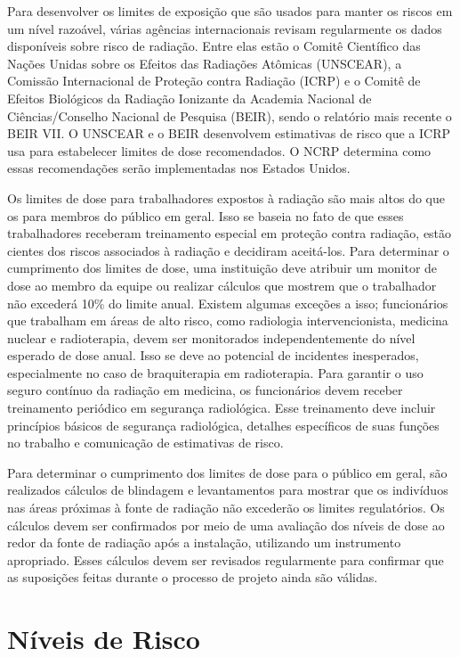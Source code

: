 \documentclass[11pt,a4paper]{article}
\begin{document}
	Para desenvolver os limites de exposição que são usados para manter os riscos em um nível razoável, várias agências internacionais revisam regularmente os dados disponíveis sobre risco de radiação. Entre elas estão o Comitê Científico das Nações Unidas sobre os Efeitos das Radiações Atômicas (UNSCEAR), a Comissão Internacional de Proteção contra Radiação (ICRP) e o Comitê de Efeitos Biológicos da Radiação Ionizante da Academia Nacional de Ciências/Conselho Nacional de Pesquisa (BEIR), sendo o relatório mais recente o BEIR VII. O UNSCEAR e o BEIR desenvolvem estimativas de risco que a ICRP usa para estabelecer limites de dose recomendados. O NCRP determina como essas recomendações serão implementadas nos Estados Unidos.

	Os limites de dose para trabalhadores expostos à radiação são mais altos do que os para membros do público em geral. Isso se baseia no fato de que esses trabalhadores receberam treinamento especial em proteção contra radiação, estão cientes dos riscos associados à radiação e decidiram aceitá-los. Para determinar o cumprimento dos limites de dose, uma instituição deve atribuir um monitor de dose ao membro da equipe ou realizar cálculos que mostrem que o trabalhador não excederá 10\% do limite anual. Existem algumas exceções a isso; funcionários que trabalham em áreas de alto risco, como radiologia intervencionista, medicina nuclear e radioterapia, devem ser monitorados independentemente do nível esperado de dose anual. Isso se deve ao potencial de incidentes inesperados, especialmente no caso de braquiterapia em radioterapia. Para garantir o uso seguro contínuo da radiação em medicina, os funcionários devem receber treinamento periódico em segurança radiológica. Esse treinamento deve incluir princípios básicos de segurança radiológica, detalhes específicos de suas funções no trabalho e comunicação de estimativas de risco.

	Para determinar o cumprimento dos limites de dose para o público em geral, são realizados cálculos de blindagem e levantamentos para mostrar que os indivíduos nas áreas próximas à fonte de radiação não excederão os limites regulatórios. Os cálculos devem ser confirmados por meio de uma avaliação dos níveis de dose ao redor da fonte de radiação após a instalação, utilizando um instrumento apropriado. Esses cálculos devem ser revisados regularmente para confirmar que as suposições feitas durante o processo de projeto ainda são válidas.

\section{Níveis de Risco}
\end{document}
